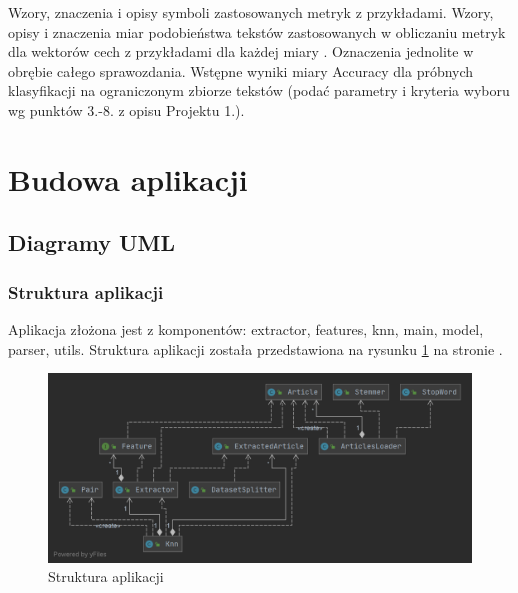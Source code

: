 \documentclass{classrep}
\begin{document}
Wzory, znaczenia i opisy symboli zastosowanych metryk z
przykładami. Wzory, opisy i znaczenia miar
podobieństwa tekstów zastosowanych w obliczaniu metryk dla wektorów cech z
przykładami dla każdej miary \cite{niewiadomski08}.  Oznaczenia jednolite w obrębie całego sprawozdania.  Wstępne wyniki miary Accuracy dla próbnych klasyfikacji na ograniczonym zbiorze tekstów (podać parametry i kryteria
wyboru wg punktów 3.-8. z opisu Projektu 1.). \\ 

\section{Budowa aplikacji}
\subsection{Diagramy UML}

\subsubsection{Struktura aplikacji}
Aplikacja złożona jest z komponentów: extractor, features, knn, main, model, parser, utils. Struktura aplikacji została przedstawiona na rysunku \ref{app} na stronie \pageref{app}.

\begin{figure}
\label{app}
\includegraphics[scale=0.35]{App structure}
\caption{Struktura aplikacji}
\end{figure}
\end{document}
